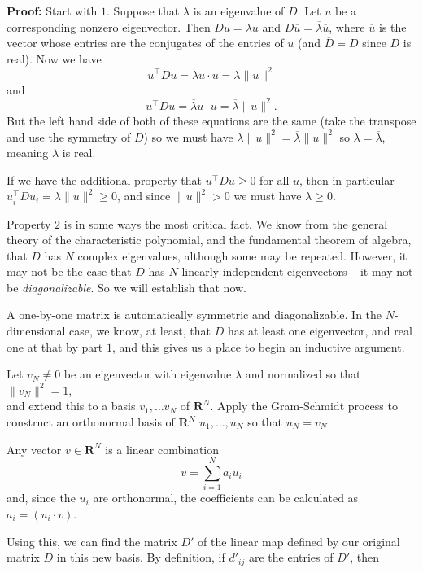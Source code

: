 \documentclass[
  oneside]{scrbook}
\begin{document}
\textbf{Proof:} Start with \(1\). Suppose that \(\lambda\) is an
eigenvalue of \(D\). Let \(u\) be a corresponding nonzero eigenvector.
Then \(Du=\lambda u\) and
\(D\overline{u}=\overline{\lambda}\overline{u}\), where \(\overline{u}\)
is the vector whose entries are the conjugates of the entries of \(u\)
(and \(\overline{D}=D\) since \(D\) is real). Now we have \[
\overline{u}^{\intercal}Du = \lambda \overline{u}\cdot u = \lambda\|u\|^2
\] and \[
u^{\intercal}D\overline{u} = \overline{\lambda}u\cdot \overline{u} = \overline{\lambda}\|u\|^2.
\] But the left hand side of both of these equations are the same (take
the transpose and use the symmetry of \(D\)) so we must have
\(\lambda\|u\|^2 = \overline{\lambda}\|u\|^2\) so
\(\lambda=\overline{\lambda}\), meaning \(\lambda\) is real.

If we have the additional property that \(u^{\intercal}Du\ge 0\) for all
\(u\), then in particular
\(u_{i}^{\intercal}Du_{i} = \lambda\|u\|^2\ge 0\), and since
\(\|u\|^2> 0\) we must have \(\lambda\ge 0\).

Property \(2\) is in some ways the most critical fact. We know from the
general theory of the characteristic polynomial, and the fundamental
theorem of algebra, that \(D\) has \(N\) complex eigenvalues, although
some may be repeated. However, it may not be the case that \(D\) has
\(N\) linearly independent eigenvectors -- it may not be
\emph{diagonalizable}. So we will establish that now.

A one-by-one matrix is automatically symmetric and diagonalizable. In
the \(N\)-dimensional case, we know, at least, that \(D\) has at least
one eigenvector, and real one at that by part \(1\), and this gives us a
place to begin an inductive argument.

Let \(v_{N}\not=0\) be an eigenvector with eigenvalue \(\lambda\) and
normalized so that \(\|v_{N}\|^2=1\),\\
and extend this to a basis \(v_{1},\ldots v_{N}\) of \(\mathbf{R}^{N}\).
Apply the Gram-Schmidt process to construct an orthonormal basis of
\(\mathbf{R}^{N}\) \(u_{1},\ldots, u_{N}\) so that \(u_{N}=v_{N}\).

Any vector \(v\in\mathbf{R}^{N}\) is a linear combination \[
v = \sum_{i=1}^{N} a_{i}u_{i}
\] and, since the \(u_{i}\) are orthonormal, the coefficients can be
calculated as \(a_{i}=(u_{i}\cdot v)\).

Using this, we can find the matrix \(D'\) of the linear map defined by
our original matrix \(D\) in this new basis. By definition, if
\(d'_{ij}\) are the entries of \(D'\), then
\end{document}

